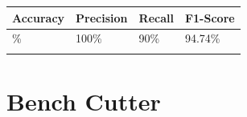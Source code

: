
{\def\LTcaptype{none} %
\begin{longtable}[]{@{}llll@{}}
\toprule\noalign{}
\textbf{Accuracy} & \textbf{Precision} & \textbf{Recall} &
\textbf{F1-Score} \\
\midrule\noalign{}
\endhead
95\% & 100\% & 90\% & 94.74\% \\
\bottomrule\noalign{}
\end{longtable}
}

\section{Bench Cutter}\label{appendix-e.8.-arc-fault-test-result-for-bench-cutter}


